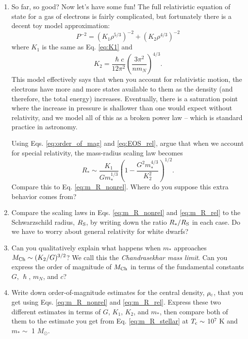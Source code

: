 \documentclass[11pt]{article}
\begin{document}
\begin{enumerate}
\clearpage

\item So far, so good? Now let's have some fun! The full relativistic equation of state for a gas of electrons is fairly complicated, but fortunately there is a decent toy model approximation:
\begin{equation}\label{eq:EOS_rel}
P^{-2} = \left( K_1 \rho^{5/3} \right)^{-2} + \left( K_2 \rho^{4/3} \right)^{-2}
\end{equation}
where $K_1$ is the same as Eq. \ref{eq:K1} and
\begin{equation}\label{eq:K2}
K_2 = \frac{\hslash c}{12 \pi^2} \left( \frac{3\pi^2}{nm_N} \right)^{4/3}.
\end{equation}
This model effectively says that when you account for relativistic motion, the electrons have more and more states available to them as the density (and therefore, the total energy) increases. Eventually, there is a saturation point where the increase in pressure is shallower than one would expect without relativity, and we model all of this as a broken power law -- which is standard practice in astronomy.

\hspace{15pt} Using Eqs. \ref{eq:order_of_mag} and \ref{eq:EOS_rel}, argue that when we account for special relativity, the mass-radius scaling law becomes
\begin{equation}\label{eq:m_R_rel}
R_* \sim \frac{K_1}{Gm_*^{1/3}} \left( 1 - \frac{G^2m_*^{4/3}}{K_2^2} \right)^{1/2}.
\end{equation}
Compare this to Eq. \ref{eq:m_R_nonrel}. Where do you suppose this extra behavior comes from?

\item Compare the scaling laws in Eqs. \ref{eq:m_R_nonrel} and \ref{eq:m_R_rel} to the Schwarzschild radius, $R_{\rm S}$, by writing down the ratio $R_*/R_{\rm S}$ in each case. Do we have to worry about general relativity for white dwarfs?

\item Can you qualitatively explain what happens when $m_*$ approaches $M_{\rm Ch} \sim (K_2/G)^{3/2}$? We call this the \textit{Chandrasekhar mass limit}. Can you express the order of magnitude of $M_{\rm Ch}$ in terms of the fundamental constants $G$, $\hslash$, $m_N$, and $c$?

\item Write down order-of-magnitude estimates for the central density, $\rho_{\rm c}$, that you get using Eqs. \ref{eq:m_R_nonrel} and \ref{eq:m_R_rel}. Express these two different estimates in terms of $G$, $K_1$, $K_2$, and $m_*$, then compare both of them to the estimate you get from Eq. \ref{eq:m_R_stellar} at $T_{\rm c} \sim$ 10$^7$ K and $m_* \sim$ 1 $M_{\odot}$.


\end{enumerate}
\end{document}

